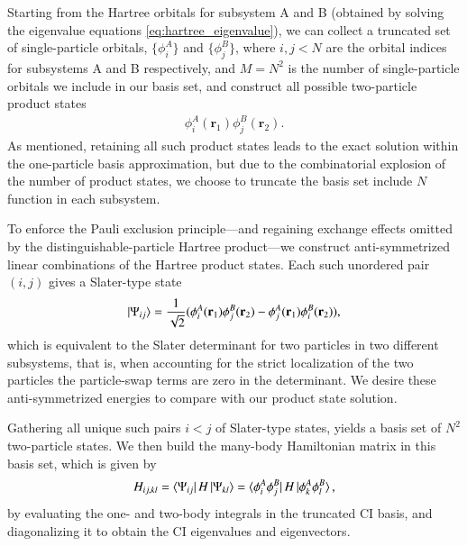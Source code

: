 \documentclass{subfiles}
\begin{document}
Starting from the Hartree orbitals for subsystem A and B (obtained by solving the eigenvalue equations \ref{eq:hartree_eigenvalue}), we can collect a truncated set of single-particle orbitals, $\{\phi^A_i\}$ and $\{\phi^B_j\}$, where $i,j<N$ are the orbital indices for subsystems A and B respectively, and $M=N^2$ is the number of single-particle orbitals we include in our basis set, and construct all possible two-particle product states
\begin{align*}
    \phi_i^A(\mathbf{r}_1)\phi_j^B(\mathbf{r}_2).
\end{align*}  
As mentioned, retaining all such product states leads to the exact solution within the one-particle basis approximation, but due to the combinatorial explosion of the number of product states, we choose to truncate the basis set include $N$ function in each subsystem. 

To enforce the Pauli exclusion principle—and regaining exchange effects omitted by the distinguishable-particle Hartree product—we construct anti-symmetrized linear combinations of the Hartree product states. Each such unordered pair $(i,j)$ gives a Slater-type state
\begin{align*}
    \ket{\Psi_{ij}} = \frac{1}{\sqrt{2}}(\phi_i^A(\mathbf{r}_1)\phi_j^B(\mathbf{r}_2) - \phi_j^A(\mathbf{r}_1)\phi_i^B(\mathbf{r}_2)),
\end{align*}
which is equivalent to the Slater determinant for two particles in two different subsystems, that is, when accounting for the strict localization of the two particles the particle-swap terms are zero in the determinant. We desire these anti-symmetrized energies to compare with our product state solution. 

Gathering all unique such pairs $i<j$ of Slater-type states, yields a basis set of $N^2$ two-particle states. We then build the many-body Hamiltonian matrix in this basis set, which is given by
\begin{align*}
    H_{ij,kl} = \bra{\Psi_{ij}}H\ket{\Psi_{kl}} = \bra{\phi_i^A\phi_j^B}H\ket{\phi_k^A\phi_l^B},
\end{align*}
by evaluating the one- and two-body integrals in the truncated CI basis, and diagonalizing it to obtain the CI eigenvalues and eigenvectors. 

\end{document}
